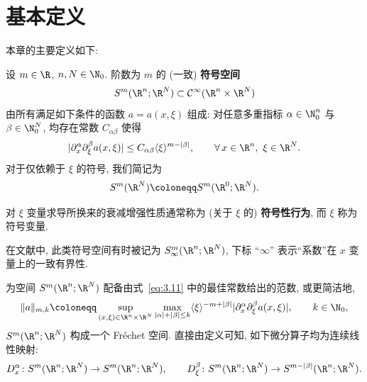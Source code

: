 \section{基本定义}\label{sec:3.1}
%
%

本章的主要定义如下:

\begin{definition}[符号类]\label{def:3.4}
设 $m \in \R$, $n, N \in \N_0$. 阶数为 $m$ 的 (一致) \textbf{符号空间}
\begin{equation}\label{eq:3.10}
    S^m(\R^n; \R^N) \subset \mathcal{C}^\infty(\R^n \times \R^N)
\end{equation}
由所有满足如下条件的函数 $a = a(x, \xi)$ 组成: 对任意多重指标 $\alpha \in \N_0^n$ 与 $\beta \in \N_0^N$, 均存在常数 $C_{\alpha\beta}$ 使得
\begin{equation}\label{eq:3.11}
    |\partial_x^\alpha \partial_\xi^\beta a(x, \xi)| \le C_{\alpha\beta} \langle \xi \rangle^{m - |\beta|}, \qquad \forall\,x \in \R^n, \ \xi \in \R^N.
\end{equation}
对于仅依赖于 $\xi$ 的符号, 我们简记为
\begin{equation}\label{eq:3.12}
    S^m(\R^N) \defeq S^m(\R^0; \R^N).
\end{equation}
\end{definition}

对 $\xi$ 变量求导所换来的衰减增强性质通常称为 (关于 $\xi$ 的) \textbf{符号性行为}, 而 $\xi$ 称为符号变量.

\begin{remark}[其他常见记号]\label{rem:3.5}
在文献中, 此类符号空间有时被记为 $S^m_\infty(\R^n; \R^N)$, 下标 ``$\infty$'' 表示“系数”在 $x$ 变量上的一致有界性.
\end{remark}

为空间 $S^m(\R^n; \R^N)$ 配备由式~\eqref{eq:3.11} 中的最佳常数给出的范数, 或更简洁地,
\begin{equation}\label{eq:3.13}
    \|a\|_{m, k} \defeq \sup_{(x, \xi) \in \R^n \times \R^N} \max_{|\alpha| + |\beta| \le k} \langle \xi \rangle^{-m + |\beta|} |\partial_x^\alpha \partial_\xi^\beta a(x, \xi)|, \qquad k \in \N_0,
\end{equation}
$S^m(\R^n; \R^N)$ 构成一个 Fréchet 空间. 直接由定义可知, 如下微分算子均为连续线性映射:
\begin{equation}\label{eq:3.14}
    D_x^\alpha \colon S^m(\R^n; \R^N) \to S^m(\R^n; \R^N), \qquad D_\xi^\beta \colon S^m(\R^n; \R^N) \to S^{m - |\beta|}(\R^n; \R^N).
\end{equation}

